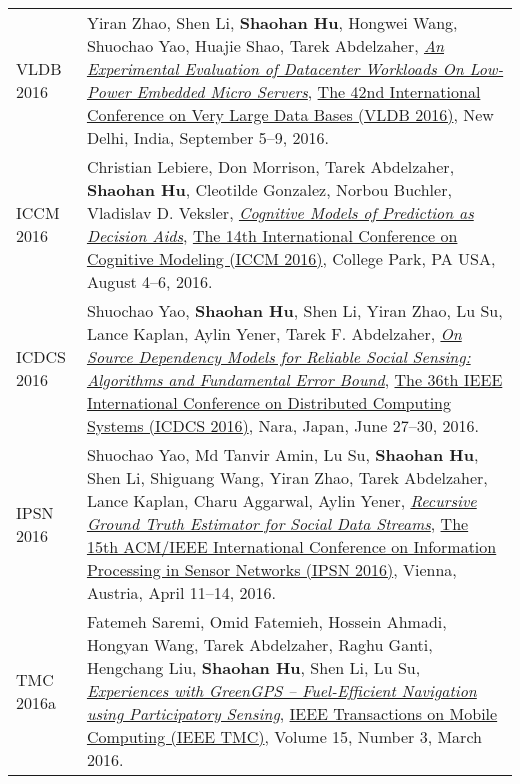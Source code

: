 \begin{longtabu}{p{.51\sectionwidth} p{.78\resumewidth}}
{\sc VLDB 2016}\hypertarget{zhao2016vldb}{} &
Yiran Zhao, Shen Li, \textbf{Shaohan Hu}, Hongwei Wang, Shuochao Yao, Huajie Shao, Tarek Abdelzaher,
\href{http://dl.acm.org/citation.cfm?id=2947625}{\emph{An Experimental Evaluation of Datacenter Workloads On Low-Power Embedded Micro Servers}},
\href{http://vldb2016.persistent.com/}{\textsf{The 42nd International Conference on Very Large Data Bases (VLDB 2016)}},
New Delhi, India, September 5--9, 2016. \\

{\sc ICCM 2016}\hypertarget{Lebiere2016iccm}{} &
Christian Lebiere, Don Morrison, Tarek Abdelzaher, \textbf{Shaohan Hu}, Cleotilde Gonzalez, Norbou Buchler, Vladislav D. Veksler,
\href{http://acs.ist.psu.edu/iccm2016/proceedings/lebiere2016iccm.pdf}{\emph{Cognitive Models of Prediction as Decision Aids}},
\href{http://acs.ist.psu.edu/iccm2016/}{\textsf{The 14th International Conference on Cognitive Modeling (ICCM 2016)}},
College Park, PA USA, August 4--6, 2016. \\

{\sc ICDCS 2016}\hypertarget{yao2016icdcs}{} &
Shuochao Yao, \textbf{Shaohan Hu}, Shen Li, Yiran Zhao, Lu Su, Lance Kaplan, Aylin Yener, Tarek F. Abdelzaher,
\href{http://ieeexplore.ieee.org/document/7536545}{\emph{On Source Dependency Models for Reliable Social Sensing: Algorithms and Fundamental Error Bound}},
\href{http://www-higashi.ist.osaka-u.ac.jp/icdcs2016/}{\textsf{The 36th IEEE International Conference on Distributed Computing Systems (ICDCS 2016)}},
Nara, Japan, June 27--30, 2016. \\

{\sc IPSN 2016}\hypertarget{yao2016ipsn}{} &
Shuochao Yao, Md Tanvir Amin, Lu Su, \textbf{Shaohan Hu}, Shen Li, Shiguang Wang, Yiran Zhao, Tarek Abdelzaher, Lance Kaplan, Charu Aggarwal, Aylin Yener,
\href{http://ieeexplore.ieee.org/document/7460719}{\emph{Recursive Ground Truth Estimator for Social Data Streams}},
\href{http://ipsn.acm.org/2016/}{\textsf{The 15th ACM/IEEE International Conference on Information Processing in Sensor Networks (IPSN 2016)}},
Vienna, Austria, April 11--14, 2016. \\

{\sc TMC 2016a}\hypertarget{saremi2016tmc}{} &
Fatemeh Saremi, Omid Fatemieh, Hossein Ahmadi, Hongyan Wang, Tarek Abdelzaher, Raghu Ganti, Hengchang Liu, \textbf{Shaohan Hu}, Shen Li, Lu Su,
\href{http://ieeexplore.ieee.org/document/7084108}{\emph{Experiences with GreenGPS -- Fuel-Efficient Navigation using Participatory Sensing}},
\href{http://www.computer.org/web/tmc}{\textsf{IEEE Transactions on Mobile Computing (IEEE TMC)}},
Volume 15, Number 3, March 2016. \\


\end{longtabu}
